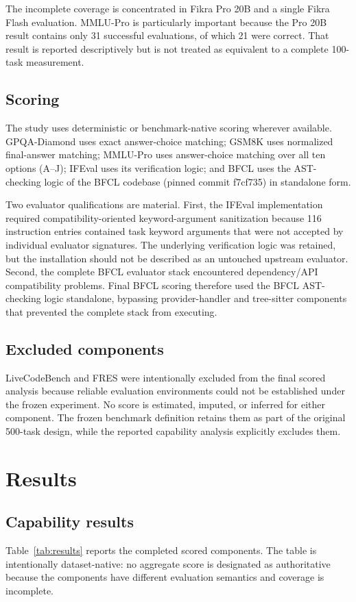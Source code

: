 \documentclass[11pt]{article}
\begin{document}


The incomplete coverage is concentrated in Fikra Pro 20B and a single Fikra Flash evaluation. MMLU-Pro is particularly important because the Pro 20B result contains only 31 successful evaluations, of which 21 were correct. That result is reported descriptively but is not treated as equivalent to a complete 100-task measurement.

\subsection{Scoring}
The study uses deterministic or benchmark-native scoring wherever available. GPQA-Diamond uses exact answer-choice matching; GSM8K uses normalized final-answer matching; MMLU-Pro uses answer-choice matching over all ten options (A--J); IFEval uses its verification logic; and BFCL uses the AST-checking logic of the BFCL codebase (pinned commit f7cf735) in standalone form.

Two evaluator qualifications are material. First, the IFEval implementation required compatibility-oriented keyword-argument sanitization because 116 instruction entries contained task keyword arguments that were not accepted by individual evaluator signatures. The underlying verification logic was retained, but the installation should not be described as an untouched upstream evaluator. Second, the complete BFCL evaluator stack encountered dependency/API compatibility problems. Final BFCL scoring therefore used the BFCL AST-checking logic standalone, bypassing provider-handler and tree-sitter components that prevented the complete stack from executing.

\subsection{Excluded components}
LiveCodeBench and FRES were intentionally excluded from the final scored analysis because reliable evaluation environments could not be established under the frozen experiment. No score is estimated, imputed, or inferred for either component. The frozen benchmark definition retains them as part of the original 500-task design, while the reported capability analysis explicitly excludes them.

\section{Results}
\subsection{Capability results}
Table~\ref{tab:results} reports the completed scored components. The table is intentionally dataset-native: no aggregate score is designated as authoritative because the components have different evaluation semantics and coverage is incomplete.
\end{document}
